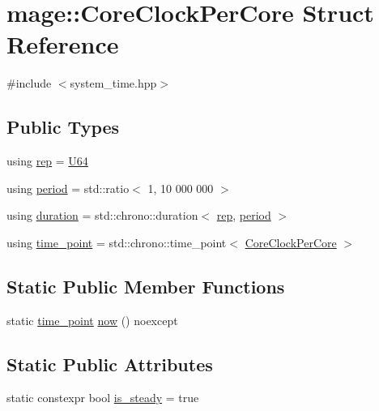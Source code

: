 \hypertarget{structmage_1_1_core_clock_per_core}{}\section{mage\+:\+:Core\+Clock\+Per\+Core Struct Reference}
\label{structmage_1_1_core_clock_per_core}


{\ttfamily \#include $<$system\+\_\+time.\+hpp$>$}

\subsection*{Public Types}
\begin{DoxyCompactItemize}
\item 
using \hyperlink{structmage_1_1_core_clock_per_core_aa34a8dcc61837ace0b47ed84c04fa1d1}{rep} = \hyperlink{namespacemage_a6672cf3c861707ce4a3235a3eb43941d}{U64}
\item 
using \hyperlink{structmage_1_1_core_clock_per_core_a2ab911c3a02786c9c1677c2f0566607a}{period} = std\+::ratio$<$ 1, 10 \textquotesingle{}000 \textquotesingle{}000 $>$
\item 
using \hyperlink{structmage_1_1_core_clock_per_core_a47e355809faa2551bd13ade9eee26d9e}{duration} = std\+::chrono\+::duration$<$ \hyperlink{structmage_1_1_core_clock_per_core_aa34a8dcc61837ace0b47ed84c04fa1d1}{rep}, \hyperlink{structmage_1_1_core_clock_per_core_a2ab911c3a02786c9c1677c2f0566607a}{period} $>$
\item 
using \hyperlink{structmage_1_1_core_clock_per_core_ab37b1036bb4697f16dd5dee6f169e7c3}{time\+\_\+point} = std\+::chrono\+::time\+\_\+point$<$ \hyperlink{structmage_1_1_core_clock_per_core}{Core\+Clock\+Per\+Core} $>$
\end{DoxyCompactItemize}
\subsection*{Static Public Member Functions}
\begin{DoxyCompactItemize}
\item 
static \hyperlink{structmage_1_1_core_clock_per_core_ab37b1036bb4697f16dd5dee6f169e7c3}{time\+\_\+point} \hyperlink{structmage_1_1_core_clock_per_core_a416a2875f7025a89948f5b75feb3fad9}{now} () noexcept
\end{DoxyCompactItemize}
\subsection*{Static Public Attributes}
\begin{DoxyCompactItemize}
\item 
static constexpr bool \hyperlink{structmage_1_1_core_clock_per_core_af4be3201fc4c1fc55c37db59143c9865}{is\+\_\+steady} = true
\end{DoxyCompactItemize}


